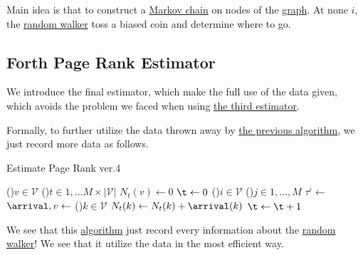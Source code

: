 \begin{prev}
	Main idea is that to construct a \hyperref[def:Markov-chain]{Markov chain} on nodes of the \hyperref[def:graph]{graph}. At none \(i\), the \hyperref[def:random-walker]{random walker} toss a biased coin and determine where to go.
\end{prev}

\subsection{Forth Page Rank Estimator}
We introduce the final estimator, which make the full use of the data given, which avoids the problem we faced when using \hyperref[subsec:third-page-rank-estimator]{the third estimator}.

Formally, to further utilize the data thrown away by \hyperref[algo:Monte-Carlo-algorithm-3]{the previous algorithm}, we just record more data as follows.

\begin{algorithm}[H]\label{algo:Monte-Carlo-algorithm-4}
	\DontPrintSemicolon
	\caption{Estimate Page Rank ver.4}

	\BlankLine

	\For(){\(v\in \mathcal{V} \)}{
		\For(){\(t\in 1, \dots M \times \left\vert \mathcal{V}  \right\vert  \)}{
			\(N_t(v)\gets 0\)\;
		}
	}
	\(\t\gets 0\)\;
	\;
	\For(){\(i\in \mathcal{V}\)}{
		\For(){\(j\in 1, \dots, M\)}{
			\(\tau^i \gets \) 
			\(\arrival, v \gets\)
			\For(){\(k\in \mathcal{V} \)}{
				\(N_t(k)\gets N_t(k) + \arrival(k)\)\;
			}
			\(\t\gets \t + 1\)\;
		}
	}
	\;
\end{algorithm}
\begin{intuition}
	We see that this \hyperref[algo:Monte-Carlo-algorithm-4]{algorithm} just record every information about the \hyperref[def:random-walker]{random walker}! We see that it utilize the data in the most efficient way.
\end{intuition}

